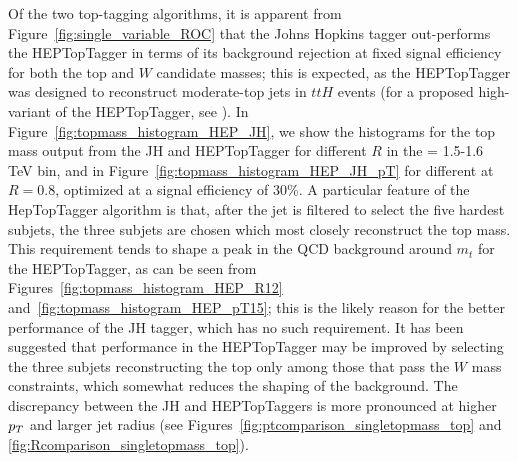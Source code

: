 Of the two top-tagging algorithms, it is apparent from Figure~\ref{fig:single_variable_ROC} that the Johns Hopkins tagger out-performs the HEPTopTagger in terms of its background rejection at fixed signal efficiency for both the top and $W$ candidate masses; this is expected, as the HEPTopTagger was designed to reconstruct moderate-\pt top jets in $ttH$ events (for a proposed high-\pt variant of the HEPTopTagger, see \cite{Schaetzel:2013vka}). In Figure~\ref{fig:topmass_histogram_HEP_JH}, we show the histograms for the top mass output from the JH and HEPTopTagger for different $R$ in the \pt =  1.5-1.6 TeV bin, and in Figure~\ref{fig:topmass_histogram_HEP_JH_pT} for different \pt at $R=0.8$, optimized at a signal efficiency of 30\%. 
A particular feature of the HepTopTagger algorithm is that, after the jet is filtered to select the five hardest subjets, the three subjets are chosen which most closely reconstruct the top mass. This requirement tends to shape a peak in the QCD background around $m_t$ for the HEPTopTagger, as can be seen from Figures~\ref{fig:topmass_histogram_HEP_R12} and~\ref{fig:topmass_histogram_HEP_pT15}; this is the likely reason for the better performance of the JH tagger, which has no such requirement.
It has been suggested  \cite{Anders:2013oga} that performance in the HEPTopTagger may be improved by selecting the three subjets reconstructing the top only among those that pass the $W$ mass constraints, which somewhat reduces the shaping of the background. The discrepancy between the JH and HEPTopTaggers is more pronounced  at higher $p_T$ and larger jet radius (see Figures~\ref{fig:ptcomparison_singletopmass_top} and \ref{fig:Rcomparison_singletopmass_top}). 

